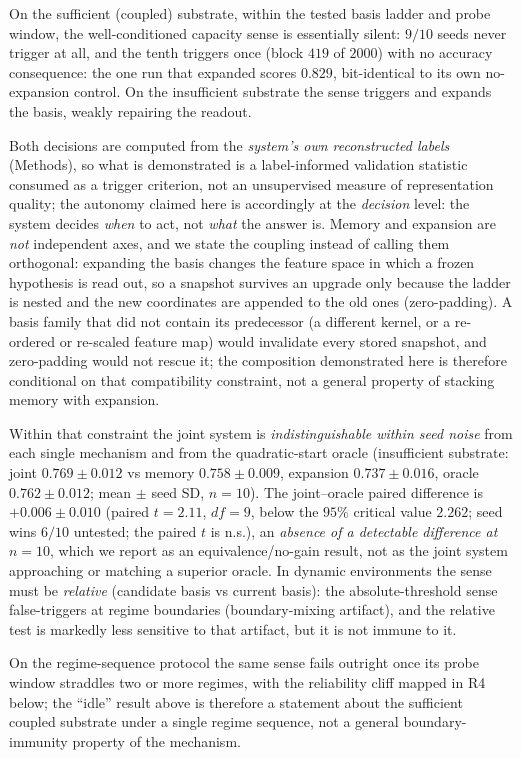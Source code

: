 \documentclass[preprint,12pt]{elsarticle}
\begin{document}
On the
sufficient (coupled) substrate, within the tested basis ladder and probe
window, the
well-conditioned capacity sense is essentially silent: $9/10$ seeds never
trigger at all, and the tenth triggers once (block $419$ of $2000$) with no
accuracy consequence: the one run that expanded scores $0.829$, bit-identical
to its own no-expansion control. On the insufficient substrate the sense
triggers and expands the basis, weakly
repairing the readout.

Both decisions are computed from the
\emph{system's own reconstructed labels} (Methods), so what is demonstrated
is a label-informed validation statistic consumed as a trigger criterion, not
an unsupervised measure of representation quality; the autonomy claimed here
is accordingly at the \emph{decision} level: the system decides
\emph{when} to act, not \emph{what} the answer is. Memory and expansion are
\emph{not} independent axes, and we state the coupling instead of calling them
orthogonal: expanding the basis changes the feature space in which a frozen
hypothesis is read out, so a snapshot survives an upgrade only because the
ladder is nested and the new coordinates are appended to the old ones
(zero-padding). A basis family that did not contain its predecessor (a
different kernel, or a re-ordered or re-scaled feature map) would
invalidate every stored snapshot, and zero-padding would not rescue it; the
composition demonstrated here is therefore conditional on that compatibility
constraint, not a general property of stacking memory with expansion.

Within
that constraint the joint system is
\emph{indistinguishable within seed noise} from each single mechanism and
from the
quadratic-start oracle (insufficient substrate: joint $0.769\pm0.012$ vs
memory $0.758\pm0.009$, expansion $0.737\pm0.016$, oracle $0.762\pm0.012$;
mean $\pm$ seed SD, $n=10$). The
joint--oracle paired difference is $+0.006\pm0.010$ (paired
$t=2.11$, $df=9$, below the $95\%$ critical value $2.262$; seed wins
$6/10$ untested; the paired $t$ is n.s.), an \emph{absence of a detectable difference at
$n=10$}, which we report as an equivalence/no-gain result, not as the joint
system approaching or matching a superior oracle. In dynamic environments the
sense must be \emph{relative} (candidate basis vs current basis): the
absolute-threshold sense false-triggers at regime boundaries
(boundary-mixing artifact), and the relative test is markedly less sensitive
to that artifact, but it is not immune to it.

On the regime-sequence
protocol the same sense fails outright once its probe window straddles two or
more regimes, with the reliability cliff mapped in R4 below; the ``idle''
result above is therefore a statement about the sufficient coupled substrate
under a single regime sequence, not a general
boundary-immunity property of the mechanism.
\end{document}
